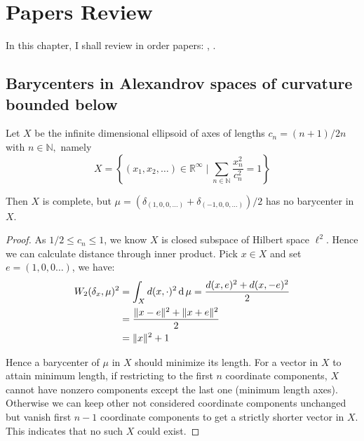 \chapter{Papers Review}
In this chapter, I shall review in order papers: \cite{ohta2012barycenters}, \cite{le2017existence}.
\section{Barycenters in Alexandrov spaces of curvature bounded below}
\begin{prop}[Example 3.1 a]
	Let \( X \) be the infinite dimensional ellipsoid of axes of lengths \( c _ { n } = ( n + 1 ) / 2 n \) with \( n \in \mathbb { N } , \) namely \[ X = \left\{ \left( x _ { 1 } , x _ { 2 } , \ldots \right) \in \mathbb { R } ^ { \infty } \mid \sum _ { n \in \mathbb { N } } \frac { x _ { n } ^ { 2 } } { c _ { n } ^ { 2 } } = 1 \right\} \]

	Then \( X \) is complete, but \( \mu = \left( \delta _ { ( 1,0,0 , \ldots ) } + \delta _ { ( - 1,0,0 , \ldots ) } \right) / 2 \) has no barycenter in \( X \).
\end{prop}

\begin{proof}
	As $ 1 / 2 \leq c_{n} \leq 1$, we know $X$ is closed subspace of Hilbert space $\ell^2$. Hence we can calculate distance through inner product. Pick $ x \in X$ and set $ e=(1,0,0\ldots)$, we have:
	\begin{align*}
		W_2(\delta_x, \mu)^2 & = \int_{X} d(x, \cdot)^2 \operatorname{d} \mu = \frac{d(x,e)^2+d(x,-e)^2 }{2} \\
		                     & =\frac{\Vert x - e \Vert^2 + \Vert x + e \Vert^2}{2}               \\
		                     & =\Vert x \Vert^2 + 1
	\end{align*}

	Hence a barycenter of $\mu$ in $X$ should minimize its length. For a vector in $X$ to attain minimum length, if restricting to the first $n$ coordinate components, $X$ cannot have nonzero components except the last one (minimum length axes). Otherwise we can keep other not considered coordinate components unchanged but vanish first $n-1$ coordinate components to get a strictly shorter vector in $X$. This indicates that no such $X$ could exist.
\end{proof}

